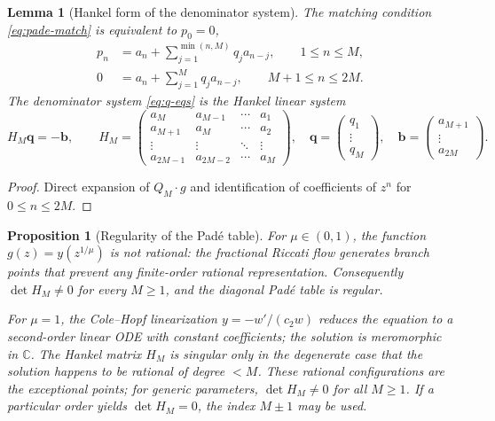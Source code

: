 \documentclass[11pt]{article}
\newtheorem{lemma}[theorem]{Lemma}
\newtheorem{proposition}[theorem]{Proposition}
\theoremstyle{definition}
\theoremstyle{remark}
\begin{document}
\begin{lemma}[Hankel form of the denominator system]
\label{lem:hankel-form}
The matching condition \eqref{eq:pade-match} is equivalent to $p_{0}=0$,
\begin{align}
p_{n}&=a_{n}+\sum_{j=1}^{\min(n,M)}q_{j}a_{n-j},
\qquad 1\le n\le M,
\label{eq:p-eqs}\\
0&=a_{n}+\sum_{j=1}^{M}q_{j}a_{n-j},
\qquad M+1\le n\le 2M.
\label{eq:q-eqs}
\end{align}
The denominator system \eqref{eq:q-eqs} is the Hankel linear system
\begin{equation}
H_{M}\bm{q}=-\bm{b},
\qquad
H_{M}=
\begin{pmatrix}
a_{M} & a_{M-1} & \cdots & a_{1}\\
a_{M+1} & a_{M} & \cdots & a_{2}\\
\vdots & \vdots & \ddots & \vdots\\
a_{2M-1} & a_{2M-2} & \cdots & a_{M}
\end{pmatrix},
\quad
\bm{q}=
\begin{pmatrix}q_{1}\\ \vdots\\ q_{M}\end{pmatrix},
\quad
\bm{b}=
\begin{pmatrix}a_{M+1}\\ \vdots\\ a_{2M}\end{pmatrix}.
\label{eq:hankel-system}
\end{equation}
\end{lemma}

\begin{proof}
Direct expansion of $Q_{M}\cdot g$ and identification of coefficients of $z^{n}$ for $0\le n\le 2M$.
\end{proof}

\begin{proposition}[Regularity of the Pad\'e table]
\label{prop:regularity}
For $\mu\in(0,1)$, the function $g(z)=y(z^{1/\mu})$ is not rational: the fractional Riccati flow generates branch points that prevent any finite-order rational representation. Consequently $\det H_{M}\ne 0$ for every $M\ge 1$, and the diagonal Pad\'e table is regular.

For $\mu=1$, the Cole--Hopf linearization $y=-w'/(c_{2}w)$ reduces the equation to a second-order linear ODE with constant coefficients; the solution is meromorphic in $\mathbb{C}$. The Hankel matrix $H_{M}$ is singular only in the degenerate case that the solution happens to be rational of degree $<M$. These rational configurations are the exceptional points; for generic parameters, $\det H_{M}\ne 0$ for all $M\ge 1$. If a particular order yields $\det H_{M}=0$, the index $M\pm 1$ may be used.
\end{proposition}
\end{document}
